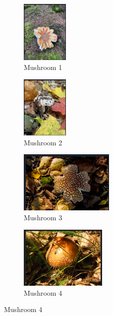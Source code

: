 \begin{figure}[!ht]
    \centering
    \begin{subfigure}{0.23\textwidth} %
        \centering
        \includegraphics[height=3cm, width=\linewidth]{images/mushroom1.png}
        \caption{Mushroom 1} %
    \end{subfigure}
    \hfill
    \begin{subfigure}{0.23\textwidth} %
        \centering
        \includegraphics[height=3cm, width=\linewidth]{images/mushroom2.png}
        \caption{Mushroom 2} %
    \end{subfigure}
    \hfill
    \begin{subfigure}{0.23\textwidth} %
        \centering
        \includegraphics[height=3cm, width=\linewidth]{images/mushroom3.png}
        \caption{Mushroom 3} %
    \end{subfigure}
    \hfill
    \begin{subfigure}{0.23\textwidth} %
        \centering
        \includegraphics[height=3cm, width=\linewidth]{images/mushroom4.png}
        \caption{Mushroom 4} %
    \end{subfigure}
    

\end{figure}
